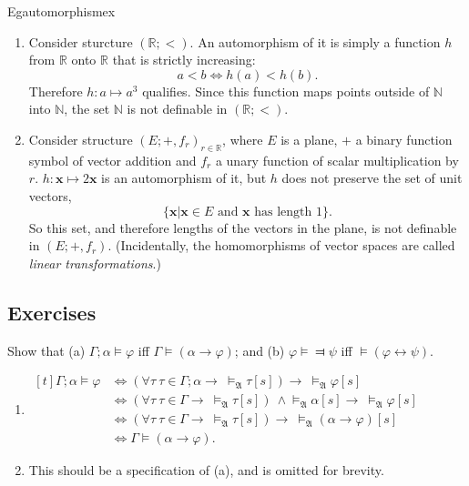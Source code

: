 \begin{reference}{Eg}{automorphismex}
  \begin{enumerate}
    \item Consider sturcture $(\mathbb{R};<)$. An automorphism of it is simply a function $h$ from $\mathbb{R}$ onto $\mathbb{R}$ that is strictly increasing:
          \[
            a<b\Leftrightarrow h(a)<h(b).
          \]
          Therefore $h: a\mapsto a^3$ qualifies. Since this function maps points outside of $\mathbb{N}$ into $\mathbb{N}$, the set $\mathbb{N}$ is not definable in $(\mathbb{R};<)$.
    \item Consider structure $(E;+,f_r)_{r\in\mathbb{R}}$, where $E$ is a plane, $+$ a binary function symbol of vector addition and $f_r$ a unary function of scalar multiplication by $r$. $h: \mathbf{x}\mapsto 2\mathbf{x}$ is an automorphism of it, but $h$ does not preserve the set of unit vectors,
          \[
            \{\mathbf{x}|\mathbf{x}\in E\text{ and }\mathbf{x}\text{ has length }1\}.
          \]
          So this set, and therefore lengths of the vectors in the plane, is not definable in $(E;+,f_r)$. (Incidentally, the homomorphisms of vector spaces are called \textit{linear transformations}.)\qedhere
  \end{enumerate}
\end{reference}

\subsection*{Exercises}

\begin{exercise}
  Show that (a) $\Gamma;\alpha\vDash \varphi$ iff $\Gamma\vDash(\alpha\to \varphi)$; and (b) $\varphi\vDash\Dashv \psi$ iff $\vDash(\varphi \leftrightarrow \psi).$
\end{exercise}

\begin{enumerate}[label=(\alph*)]
  \item
        $\begin{aligned}[t]
            \Gamma;\alpha\vDash \varphi & \Leftrightarrow(\forall\tau\ \tau\in\Gamma;\alpha\rightarrow\ \vDash_{\mathfrak{A}}\tau[s])\rightarrow\ \vDash_{\mathfrak{A}}\varphi[s]                                 \\
                                        & \Leftrightarrow(\forall\tau\ \tau\in \Gamma\rightarrow\ \vDash_{\mathfrak{A}}\tau[s])\ \wedge\vDash_{\mathfrak{A}}\alpha[s]\rightarrow\ \vDash_{\mathfrak{A}}\varphi[s] \\
                                        & \Leftrightarrow(\forall\tau\ \tau\in \Gamma\rightarrow\ \vDash_{\mathfrak{A}}\tau[s])\rightarrow\ \vDash_{\mathfrak{A}}(\alpha\rightarrow \varphi)[s]                   \\
                                        & \Leftrightarrow \Gamma\vDash (\alpha\rightarrow \varphi).
          \end{aligned}$
  \item This should be a specification of (a), and is omitted for brevity.
\end{enumerate}


